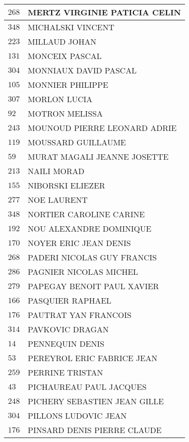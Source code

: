 \begin{xltabular}{\linewidth}{|l|X|}
    \hline
    $268$ & MERTZ VIRGINIE PATICIA CELIN \\
    \hline
    $348$ & MICHALSKI VINCENT \\
    \hline
    $223$ & MILLAUD JOHAN \\
    \hline
    $131$ & MONCEIX PASCAL \\
    \hline
    $304$ & MONNIAUX DAVID PASCAL \\
    \hline
    $105$ & MONNIER PHILIPPE \\
    \hline
    $307$ & MORLON LUCIA \\
    \hline
    $92$ & MOTRON MELISSA \\
    \hline
    $243$ & MOUNOUD PIERRE LEONARD ADRIE \\
    \hline
    $119$ & MOUSSARD GUILLAUME \\
    \hline
    $59$ & MURAT MAGALI JEANNE JOSETTE \\
    \hline
    $213$ & NAILI MORAD \\
    \hline
    $155$ & NIBORSKI ELIEZER \\
    \hline
    $277$ & NOE LAURENT \\
    \hline
    $348$ & NORTIER CAROLINE CARINE \\
    \hline
    $192$ & NOU ALEXANDRE DOMINIQUE \\
    \hline
    $170$ & NOYER ERIC JEAN DENIS \\
    \hline
    $268$ & PADERI NICOLAS GUY FRANCIS \\
    \hline
    $286$ & PAGNIER NICOLAS MICHEL \\
    \hline
    $279$ & PAPEGAY BENOIT PAUL XAVIER \\
    \hline
    $166$ & PASQUIER RAPHAEL \\
    \hline
    $176$ & PAUTRAT YAN FRANCOIS \\
    \hline
    $314$ & PAVKOVIC DRAGAN \\
    \hline
    $14$ & PENNEQUIN DENIS \\
    \hline
    $53$ & PEREYROL ERIC FABRICE JEAN \\
    \hline
    $259$ & PERRINE TRISTAN \\
    \hline
    $43$ & PICHAUREAU PAUL JACQUES \\
    \hline
    $248$ & PICHERY SEBASTIEN JEAN GILLE \\
    \hline
    $304$ & PILLONS LUDOVIC JEAN \\
    \hline
    $176$ & PINSARD DENIS PIERRE CLAUDE \\
    \hline

\end{xltabular}
